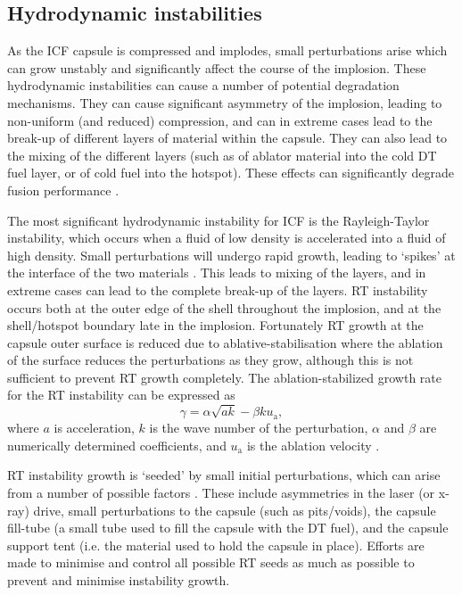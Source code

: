 \subsection{Hydrodynamic instabilities} \label{Hydro instabilities}
As the ICF capsule is compressed and implodes, small perturbations arise which can grow unstably and significantly affect the course of the implosion. These hydrodynamic instabilities can cause a number of potential degradation mechanisms. They can cause significant asymmetry of the implosion, leading to non-uniform (and reduced) compression, and can in extreme cases lead to the break-up of different layers of material within the capsule. They can also lead to the mixing of the different layers (such as of ablator material into the cold DT fuel layer, or of cold fuel into the hotspot). These effects can significantly degrade fusion performance \cite{Ma2013}.

The most significant hydrodynamic instability for ICF is the Rayleigh-Taylor instability, which occurs when a fluid of low density is accelerated into a fluid of high density. Small perturbations will undergo rapid growth, leading to `spikes' at the interface of the two materials \cite{Atzeni2008}. This leads to mixing of the layers, and in extreme cases can lead to the complete break-up of the layers. RT instability occurs both at the outer edge of the shell throughout the implosion, and at the shell/hotspot boundary late in the implosion. Fortunately RT growth at the capsule outer surface is reduced due to ablative-stabilisation where the ablation of the surface reduces the perturbations as they grow, although this is not sufficient to prevent RT growth completely. The ablation-stabilized growth rate for the RT instability can be expressed as
\begin{equation} \gamma = \alpha \sqrt{ak} - \beta k u_\mathrm{a}, \label{eq:RTI} \end{equation}
where $a$ is acceleration, $k$ is the wave number of the perturbation, $\alpha$ and $\beta$ are numerically determined coefficients, and $u_\mathrm{a}$ is the ablation velocity \cite{Takabe1985, Betti1998}.

RT instability growth is `seeded' by small initial perturbations, which can arise from a number of possible factors \cite{Haines2019a}. These include asymmetries in the laser (or x-ray) drive, small perturbations to the capsule (such as pits/voids), the capsule fill-tube (a small tube used to fill the capsule with the DT fuel), and the capsule support tent (i.e. the material used to hold the capsule in place). Efforts are made to minimise and control all possible RT seeds as much as possible to prevent and minimise instability growth.

